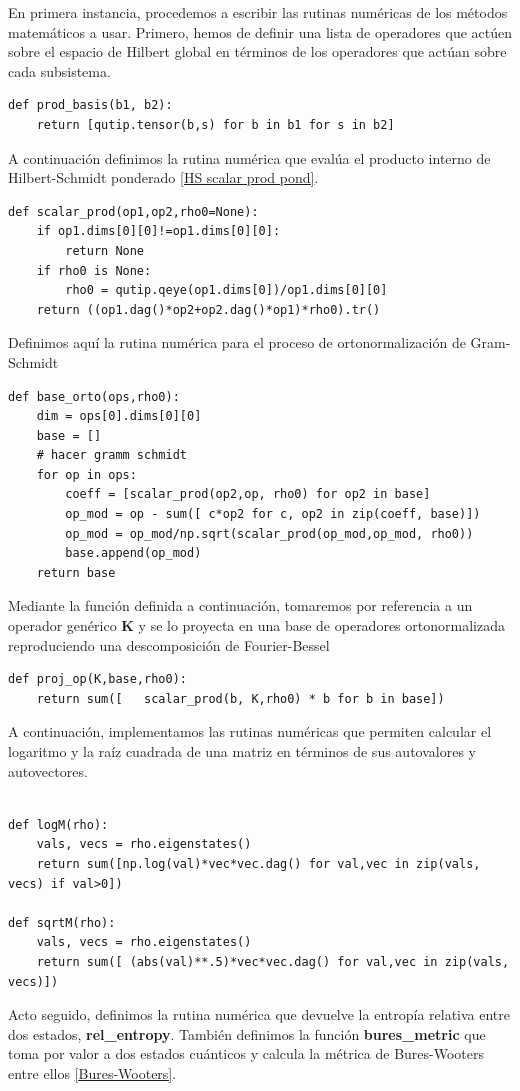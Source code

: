 \documentclass{report} %
\numberwithin{equation}{section}
\begin{document}
En primera instancia, procedemos a escribir las rutinas numéricas de los métodos matemáticos a usar. Primero, hemos de definir una lista de operadores que actúen sobre el espacio de Hilbert global en términos de los operadores que actúan sobre cada subsistema. 

\begin{Verbatim}
def prod_basis(b1, b2):
    return [qutip.tensor(b,s) for b in b1 for s in b2]
\end{Verbatim}

A continuación definimos la rutina numérica que evalúa el producto interno de Hilbert-Schmidt ponderado \eqref{HS scalar prod pond}.

\begin{verbatim}
def scalar_prod(op1,op2,rho0=None):
    if op1.dims[0][0]!=op1.dims[0][0]:
        return None
    if rho0 is None:
        rho0 = qutip.qeye(op1.dims[0])/op1.dims[0][0]
    return ((op1.dag()*op2+op2.dag()*op1)*rho0).tr()
\end{verbatim}

Definimos aquí la rutina numérica para el proceso de ortonormalización de Gram-Schmidt

\begin{verbatim}
def base_orto(ops,rho0):
    dim = ops[0].dims[0][0]
    base = []
    # hacer gramm schmidt
    for op in ops:
        coeff = [scalar_prod(op2,op, rho0) for op2 in base]
        op_mod = op - sum([ c*op2 for c, op2 in zip(coeff, base)])
        op_mod = op_mod/np.sqrt(scalar_prod(op_mod,op_mod, rho0))
        base.append(op_mod)
    return base
\end{verbatim}

Mediante la función definida a continuación, tomaremos por referencia a un operador genérico $\mathbf{K}$ y se lo proyecta en una base de operadores ortonormalizada reproduciendo una descomposición de Fourier-Bessel 

\begin{verbatim}
def proj_op(K,base,rho0):
    return sum([   scalar_prod(b, K,rho0) * b for b in base])
\end{verbatim}

A continuación, implementamos las rutinas numéricas que permiten calcular el logaritmo y la raíz cuadrada de una matriz en términos de sus autovalores y autovectores. 

\begin{verbatim}

def logM(rho):
    vals, vecs = rho.eigenstates()
    return sum([np.log(val)*vec*vec.dag() for val,vec in zip(vals, vecs) if val>0])

def sqrtM(rho):
    vals, vecs = rho.eigenstates()
    return sum([ (abs(val)**.5)*vec*vec.dag() for val,vec in zip(vals, vecs)])

\end{verbatim}
Acto seguido, definimos la rutina numérica que devuelve la entropía relativa entre dos estados, \textbf{rel_entropy}. También definimos la función \textbf{bures_metric} que toma por valor a dos estados cuánticos y calcula la métrica de Bures-Wooters entre ellos \eqref{Bures-Wooters}. 
\end{document}
